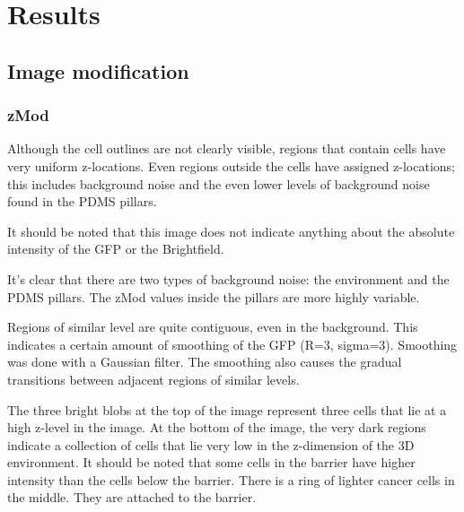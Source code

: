 
\chapter{Results}

\ifpdf
    \graphicspath{{Chapter6/Figs/Raster/}{Chapter6/Figs/PDF/}{Chapter6/Figs/}}
\else
    \graphicspath{{Chapter6/Figs/Vector/}{Chapter6/Figs/}}
\fi

\section{Image modification}

\subsection{zMod}


Although the cell outlines are not clearly visible, regions that contain cells have very uniform z-locations. Even regions outside the cells have assigned z-locations; this includes background noise and the even lower levels of background noise found in the PDMS pillars.

It should be noted that this image does not indicate anything about the absolute intensity of the GFP or the Brightfield.

It's clear that there are two types of background noise: the environment and the PDMS pillars. The zMod values inside the pillars are more highly variable.

Regions of similar level are quite contiguous, even in the background. This indicates a certain amount of smoothing of the GFP (R=3, sigma=3). Smoothing was done with a Gaussian filter. The smoothing also causes the gradual transitions between adjacent regions of similar levels.

The three bright blobs at the top of the image represent three cells that lie at a high z-level in the image. At the bottom of the image, the very dark regions indicate a collection of cells that lie very low in the z-dimension of the 3D environment. It should be noted that some cells in the barrier have higher intensity than the cells below the barrier. There is a ring of lighter cancer cells in the middle. They are attached to the barrier.

